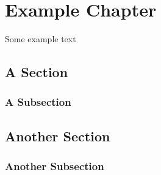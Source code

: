 \documentclass[Book Template.tex]{subfiles}
\begin{document}
    \chapter{Example Chapter}
        \label{ch: Example Chapter}
        \thispagestyle{noheader}

        Some example text

        \section{A Section}

            \subsection{A Subsection}

        \newpage

        \section{Another Section}

            \subsection{Another Subsection}
    
\end{document}
